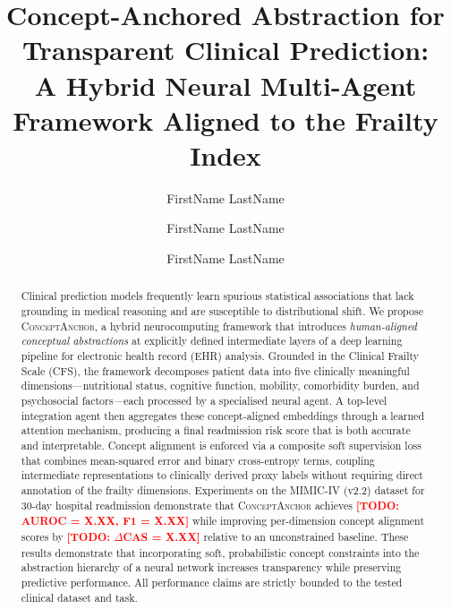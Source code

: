 \documentclass[review,12pt,authoryear]{elsarticle}
\newcommand{\todo}[1]{\textcolor{red}{\textbf{[TODO: #1]}}}
\newcommand{\modelname}{\textsc{ConceptAnchor}}
\newcommand{\dataset}{MIMIC-IV (v2.2)}
\begin{document}
\begin{frontmatter}

\title{Concept-Anchored Abstraction for Transparent Clinical Prediction:\\ A Hybrid Neural Multi-Agent Framework Aligned to the Frailty Index}

\author[inst1]{FirstName LastName}

\author[inst2]{FirstName LastName}

\author[inst1,inst2]{FirstName LastName}




\begin{abstract}
Clinical prediction models frequently learn spurious statistical associations that lack grounding in medical reasoning and are susceptible to distributional shift.
We propose \modelname, a hybrid neurocomputing framework that introduces \emph{human-aligned conceptual abstractions} at explicitly defined intermediate layers of a deep learning pipeline for electronic health record (EHR) analysis.
Grounded in the Clinical Frailty Scale (CFS), the framework decomposes patient data into five clinically meaningful dimensions—nutritional status, cognitive function, mobility, comorbidity burden, and psychosocial factors—each processed by a specialised neural agent.
A top-level integration agent then aggregates these concept-aligned embeddings through a learned attention mechanism, producing a final readmission risk score that is both accurate and interpretable.
Concept alignment is enforced via a composite soft supervision loss that combines mean-squared error and binary cross-entropy terms, coupling intermediate representations to clinically derived proxy labels without requiring direct annotation of the frailty dimensions.
Experiments on the \dataset{} dataset for 30-day hospital readmission demonstrate that \modelname{} achieves \todo{AUROC = X.XX, F1 = X.XX} while improving per-dimension concept alignment scores by \todo{$\Delta$CAS = X.XX} relative to an unconstrained baseline.
These results demonstrate that incorporating soft, probabilistic concept constraints into the abstraction hierarchy of a neural network increases transparency while preserving predictive performance.
All performance claims are strictly bounded to the tested clinical dataset and task.
\end{abstract}


\end{frontmatter}
\end{document}
